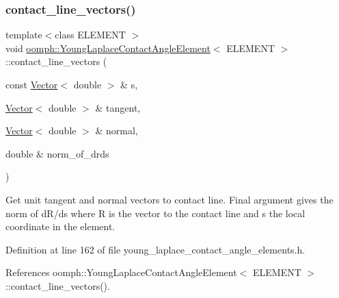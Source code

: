 \subsubsection{\texorpdfstring{contact\+\_\+line\+\_\+vectors()}{contact\_line\_vectors()}\hspace{0.1cm}{\footnotesize\ttfamily [2/3]}}
{\footnotesize\ttfamily template$<$class E\+L\+E\+M\+E\+NT $>$ \\
void \hyperlink{classoomph_1_1YoungLaplaceContactAngleElement}{oomph\+::\+Young\+Laplace\+Contact\+Angle\+Element}$<$ E\+L\+E\+M\+E\+NT $>$\+::contact\+\_\+line\+\_\+vectors (\begin{DoxyParamCaption}\item[{const \hyperlink{classoomph_1_1Vector}{Vector}$<$ double $>$ \&}]{s,  }\item[{\hyperlink{classoomph_1_1Vector}{Vector}$<$ double $>$ \&}]{tangent,  }\item[{\hyperlink{classoomph_1_1Vector}{Vector}$<$ double $>$ \&}]{normal,  }\item[{double \&}]{norm\+\_\+of\+\_\+drds }\end{DoxyParamCaption})\hspace{0.3cm}{\ttfamily [inline]}}



Get unit tangent and normal vectors to contact line. Final argument gives the norm of d\+R/ds where R is the vector to the contact line and s the local coordinate in the element. 



Definition at line 162 of file young\+\_\+laplace\+\_\+contact\+\_\+angle\+\_\+elements.\+h.



References oomph\+::\+Young\+Laplace\+Contact\+Angle\+Element$<$ E\+L\+E\+M\+E\+N\+T $>$\+::contact\+\_\+line\+\_\+vectors().

\mbox{\label{classoomph_1_1YoungLaplaceContactAngleElement_af61855a9ea41833eed6ad3a519d68687}} 
